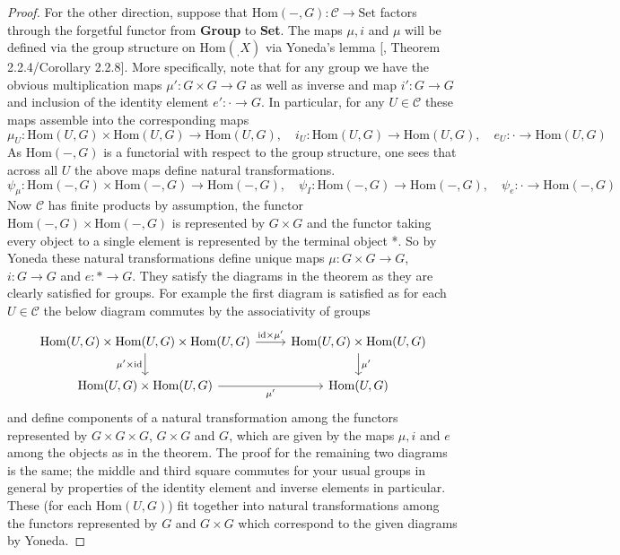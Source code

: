 \documentclass{article}
\theoremstyle{definition}
\theoremstyle{remark}
\theoremstyle{plain}
\newcommand{\mc}[1]{\mathcal{#1}}
\begin{document}
\begin{proof}
	For the other direction, suppose that $\text{Hom}(-, G): \mc{C} \to \text{Set}$ factors through the forgetful functor from \textbf{Group} to \textbf{Set}.
	The maps $\mu, i$ and $\mu$ will be defined via the group structure on $\text{Hom}(_, X)$ via Yoneda's lemma [\cite{CTIC}, Theorem 2.2.4/Corollary 2.2.8].
	More specifically, note that for any group we have the obvious multiplication maps $\mu': G \times G \to G$ as well as inverse and map $i':G \to G$ and inclusion of the identity element $e': \cdot \to G$.
	In particular, for any $U \in \mc{C}$ these maps assemble into the corresponding maps 
	\[\mu_U: \text{Hom}(U,G) \times \text{Hom}(U,G) \to \text{Hom}(U,G), \quad i_U: \text{Hom}(U,G) \to \text{Hom}(U,G), \quad e_U: \cdot \to \text{Hom}(U,G)\]
	As $\text{Hom}(-,G)$ is a functorial with respect to the group structure, one sees that across all $U$ the above maps define natural transformations.
	\[\psi_{\mu}: \text{Hom}(-,G) \times \text{Hom}(-,G) \to \text{Hom}(-,G), \quad \psi_I: \text{Hom}(-,G) \to \text{Hom}(-,G), \quad \psi_e: \cdot \to \text{Hom}(-,G)\]
	Now $\mc{C}$ has finite products by assumption, the functor $\text{Hom}(-,G) \times \text{Hom}(-,G)$ is represented by $G \times G$ and the functor taking every object to a single element is represented by the terminal object *. 
	So by Yoneda these natural transformations define unique maps $\mu: G \times G \to G$, $i: G \to G$ and $e: * \to G$. 
	They satisfy the diagrams in the theorem as they are clearly satisfied for groups.
	For example the first diagram is satisfied as for each $U \in \mc{C}$ the below diagram commutes by the associativity of groups 
\[\begin{tikzcd}
	{\text{Hom}(U,G) \times \text{Hom}(U,G) \times \text{Hom}(U,G)} & {\text{Hom}(U,G) \times \text{Hom}(U,G)} \\
	{\text{Hom}(U,G) \times \text{Hom}(U,G)} & {\text{Hom}(U,G)}
	\arrow["{ \text{id} \times \mu'}", from=1-1, to=1-2]
	\arrow["{\mu' \times \text{id}}"', from=1-1, to=2-1]
	\arrow["{\mu'}", from=1-2, to=2-2]
	\arrow["{\mu'}"', from=2-1, to=2-2]
\end{tikzcd}\]
and define components of a natural transformation among the functors represented by $G \times G \times G$, $G \times G$ and $G$, which are given by the maps $\mu, i$ and $e$ among the objects as in the theorem.
The proof for the remaining two diagrams is the same; the middle and third square commutes for your usual groups in general by properties of the identity element and inverse elements in particular. 
These (for each $\text{Hom}(U,G)$) fit together into natural transformations among the functors represented by $G$ and $G \times G$ which correspond to the given diagrams by Yoneda.
\end{proof}
\end{document}
